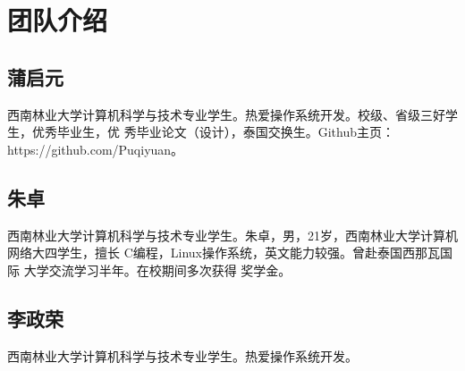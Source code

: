 \documentclass{wx672article} %
\begin{document}
\section{团队介绍}

\subsection{蒲启元}
西南林业大学计算机科学与技术专业学生。热爱操作系统开发。校级、省级三好学生，优秀毕业生，优
秀毕业论文（设计），泰国交换生。Github主页：https://github.com/Puqiyuan。

\subsection{朱卓}

西南林业大学计算机科学与技术专业学生。朱卓，男，21岁，西南林业大学计算机网络大四学生，擅长
C编程，Linux操作系统，英文能力较强。曾赴泰国西那瓦国际 大学交流学习半年。在校期间多次获得
奖学金。

\subsection{李政荣}
西南林业大学计算机科学与技术专业学生。热爱操作系统开发。
\end{document}
